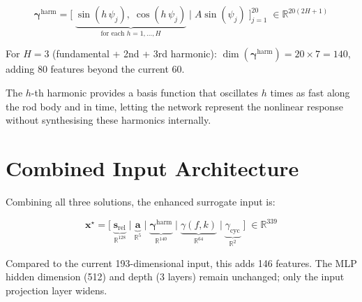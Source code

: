 \documentclass[11pt]{article}
\newcommand{\vect}[1]{\mathbf{#1}}
\newcommand{\Real}{\mathbb{R}}
\begin{document}
\begin{equation}
  \vect{\gamma}^{\mathrm{harm}} =
  \bigl[\;
    \underbrace{\sin(h\,\psi_j),\; \cos(h\,\psi_j)}_{\text{for each } h = 1, \ldots, H}
    \;\big|\;
    A \sin(\psi_j)
  \;\bigr]_{j=1}^{20}
  \;\in \Real^{20(2H + 1)}
  \label{eq:harmonics}
\end{equation}

\noindent
For $H = 3$ (fundamental + 2nd + 3rd harmonic):
$\dim(\vect{\gamma}^{\mathrm{harm}}) = 20 \times 7 = 140$,
adding 80 features beyond the current 60.

The $h$-th harmonic provides a basis function that oscillates $h$ times as fast
along the rod body and in time, letting the network represent the nonlinear
response without synthesising these harmonics internally.

\section{Combined Input Architecture}
\label{sec:combined}

Combining all three solutions, the enhanced surrogate input is:

\begin{equation}
  \vect{x}^{\star} = \bigl[\;
    \underbrace{\vect{s}_{\mathrm{rel}}}_{\Real^{128}}
    \;\big|\;
    \underbrace{\vect{a}}_{\Real^{5}}
    \;\big|\;
    \underbrace{\vect{\gamma}^{\mathrm{harm}}}_{\Real^{140}}
    \;\big|\;
    \underbrace{\gamma(f, k)}_{\Real^{64}}
    \;\big|\;
    \underbrace{\gamma_{\mathrm{cyc}}}_{\Real^{2}}
  \;\bigr]
  \;\in \Real^{339}
  \label{eq:full-input}
\end{equation}

\noindent
Compared to the current 193-dimensional input, this adds 146 features.
The MLP hidden dimension (512) and depth (3 layers) remain unchanged;
only the input projection layer widens.
\end{document}
